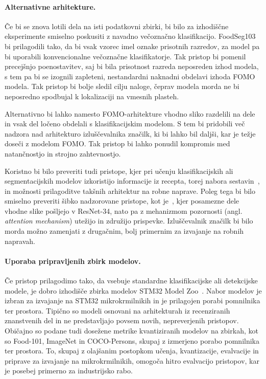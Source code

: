 \documentclass[a4paper,twoside,openright,12pt,slovene]{book}
\begin{document}
        \paragraph{Alternativne arhitekture.}
        Če bi se znova lotili dela na isti podatkovni zbirki, bi bilo za
        izhodiščne eksperimente smiselno poskusiti z navadno večoznačno
        klasifikacijo. FoodSeg103 bi prilagodili tako, da bi vsak vzorec imel
        oznake prisotnih razredov, za model pa bi uporabili konvencionalne
        večoznačne klasifikatorje. Tak pristop bi pomenil precejšnjo
        poenostavitev, saj bi bila prisotnost razreda neposreden izhod modela,
        s tem pa bi se izognili zapleteni, nestandardni naknadni obdelavi
        izhoda FOMO modela. Tak pristop bi bolje sledil cilju naloge, čeprav
        modela morda ne bi neposredno spodbujal k lokalizaciji na vmesnih plasteh.

        Alternativno bi lahko namesto FOMO-arhitekture vhodno sliko razdelili
        na dele in vsak del ločeno obdelali s klasifikacijskim modelom. S tem
        bi pridobili več nadzora nad arhitekturo izluščevalnika značilk, ki bi
        lahko bil daljši, kar je težje doseči z modelom FOMO. Tak pristop bi
        lahko ponudil kompromis med natančnostjo in strojno zahtevnostjo.
        
        Koristno bi bilo preveriti tudi pristope, kjer pri učenju
        klasifikacijskih ali segmentacijskih modelov izkoristijo informacije iz
        recepta, torej nabora sestavin~\cite{src:wu2021large,
        src:min2019ingredient}, in možnosti prilagoditve takšnih arhitektur na
        robne naprave. Poleg tega bi bilo smiselno preveriti šibko nadzorovane
        pristope, kot je~\cite{src:vlachopoulou2023food}, kjer posamezne dele
        vhodne slike pošljejo v ResNet-34, nato pa z mehanizmom pozornosti
        (angl. \textit{attention mechanism}) utežijo in združijo prispevke.
        Izluščevalnik značilk bi bilo morda možno zamenjati z drugačnim, bolj
        primernim za izvajanje na robnih napravah.
        
        \paragraph{Uporaba pripravljenih zbirk modelov.}
        Če pristop prilagodimo tako, da vsebuje standardne klasifikacijske ali
        detekcijske modele, je dobro izhodišče zbirka modelov STM32
        Model Zoo~\cite{src:stm32modelzoo}. Nabor modelov je izbran za
        izvajanje na STM32 mikrokrmilnikih in je prilagojen porabi pomnilnika
        ter prostora. Tipično so modeli osnovani na arhitekturah iz
        recenziranih znanstvenih del in ne predstavljajo povsem novih,
        nepreverjenih pristopov. Običajno so podane tudi dosežene metrike
        kvantiziranih modelov na zbirkah, kot so Food-101, ImageNet in
        COCO-Persons, skupaj z izmerjeno porabo pomnilnika ter prostora. To,
        skupaj z olajšanim postopkom učenja, kvantizacije, evalvacije in
        priprave za izvajanje na mikrokrmilnikih, omogoča hitro evalvacijo
        pristopov, kar je posebej primerno za industrijsko rabo.
        
\end{document}
